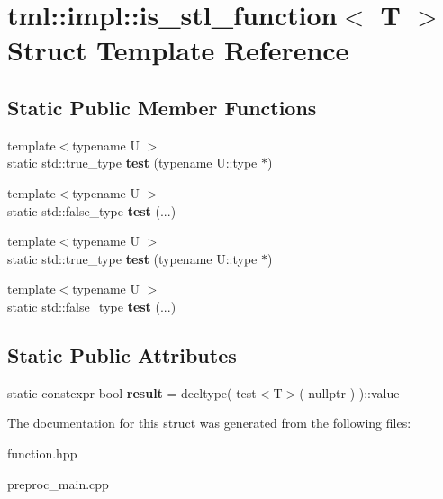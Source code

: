 \hypertarget{structtml_1_1impl_1_1is__stl__function}{\section{tml\+:\+:impl\+:\+:is\+\_\+stl\+\_\+function$<$ T $>$ Struct Template Reference}
\label{structtml_1_1impl_1_1is__stl__function}
}
\subsection*{Static Public Member Functions}
\begin{DoxyCompactItemize}
\item 
\hypertarget{structtml_1_1impl_1_1is__stl__function_ae8f7024c59465557d430bab21cbda7e4}{{\footnotesize template$<$typename U $>$ }\\static std\+::true\+\_\+type {\bfseries test} (typename U\+::type $\ast$)}\label{structtml_1_1impl_1_1is__stl__function_ae8f7024c59465557d430bab21cbda7e4}

\item 
\hypertarget{structtml_1_1impl_1_1is__stl__function_a5caafb32399a9015ffcfaa0d72b5f16e}{{\footnotesize template$<$typename U $>$ }\\static std\+::false\+\_\+type {\bfseries test} (...)}\label{structtml_1_1impl_1_1is__stl__function_a5caafb32399a9015ffcfaa0d72b5f16e}

\item 
\hypertarget{structtml_1_1impl_1_1is__stl__function_ae8f7024c59465557d430bab21cbda7e4}{{\footnotesize template$<$typename U $>$ }\\static std\+::true\+\_\+type {\bfseries test} (typename U\+::type $\ast$)}\label{structtml_1_1impl_1_1is__stl__function_ae8f7024c59465557d430bab21cbda7e4}

\item 
\hypertarget{structtml_1_1impl_1_1is__stl__function_a5caafb32399a9015ffcfaa0d72b5f16e}{{\footnotesize template$<$typename U $>$ }\\static std\+::false\+\_\+type {\bfseries test} (...)}\label{structtml_1_1impl_1_1is__stl__function_a5caafb32399a9015ffcfaa0d72b5f16e}

\end{DoxyCompactItemize}
\subsection*{Static Public Attributes}
\begin{DoxyCompactItemize}
\item 
\hypertarget{structtml_1_1impl_1_1is__stl__function_a3c8575cc66bb123e015bca4093bc00ae}{static constexpr bool {\bfseries result} = decltype( test$<$T$>$( nullptr ) )\+::value}\label{structtml_1_1impl_1_1is__stl__function_a3c8575cc66bb123e015bca4093bc00ae}

\end{DoxyCompactItemize}


The documentation for this struct was generated from the following files\+:\begin{DoxyCompactItemize}
\item 
function.\+hpp\item 
preproc\+\_\+main.\+cpp\end{DoxyCompactItemize}
